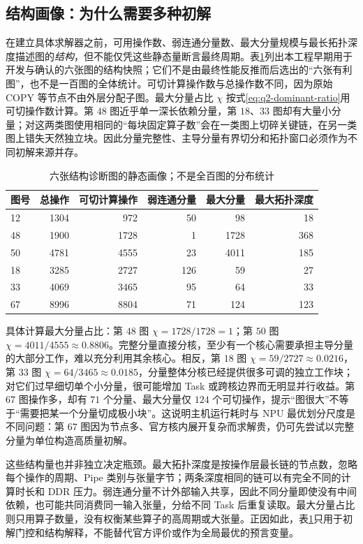 \subsection{结构画像：为什么需要多种初解}
在建立具体求解器之前，可用操作数、弱连通分量数、最大分量规模与最长拓扑深度描述图的\emph{结构}，但不能仅凭这些静态量断言最终周期。表\ref{tab:six-structure}列出本工程早期用于开发与确认的六张图的结构快照；它们不是由最终性能反推而后选出的“六张有利图”，也不是一百图的全体统计。可切计算操作数与总操作数不同，因为原始 COPY 等节点不由外层分配子图。最大分量占比 $\chi$ 按式\eqref{eq:q2-dominant-ratio}用可切操作数计算。第 $48$ 图近乎单一深长依赖分量，第 $18$、$33$ 图却有大量小分量；对这两类图使用相同的“每块固定算子数”会在一类图上切碎关键链，在另一类图上错失天然独立块。因此分量完整性、主导分量有界切分和拓扑窗口必须作为不同初解来源并存。
\begin{table}[!htbp]\centering\small
\caption{六张结构诊断图的静态画像；不是全百图的分布统计}\label{tab:six-structure}
\begin{tabular}{lrrrrr}
\toprule
图号 & 总操作 & 可切计算操作 & 弱连通分量 & 最大分量 & 最大拓扑深度\\
\midrule
12 & 1304 & 972 & 50 & 98 & 18\\
48 & 1900 & 1728 & 1 & 1728 & 368\\
50 & 4781 & 4555 & 23 & 4011 & 185\\
18 & 3285 & 2727 & 126 & 59 & 27\\
33 & 4069 & 3465 & 95 & 64 & 33\\
67 & 8996 & 8804 & 71 & 124 & 123\\
\bottomrule
\end{tabular}
\end{table}

具体计算最大分量占比：第 $48$ 图 $\chi=1728/1728=1$；第 $50$ 图 $\chi=4011/4555\approx0.8806$。完整分量直接分核，至少有一个核心需要承担主导分量的大部分工作，难以充分利用其余核心。相反，第 $18$ 图 $\chi=59/2727\approx0.0216$，第 $33$ 图 $\chi=64/3465\approx0.0185$，分量整体分核已经提供很多可调的独立工作块；对它们过早细切单个小分量，很可能增加 Task 或跨核边界而无明显并行收益。第 $67$ 图操作多，却有 $71$ 个分量、最大分量仅 $124$ 个可切操作，提示“图很大”不等于“需要把某一个分量切成极小块”。这说明主机运行耗时与 NPU 最优划分尺度是不同问题：第 $67$ 图因为节点多、官方核内展开复杂而求解贵，仍可先尝试以完整分量为单位构造高质量初解。

这些结构量也并非独立决定瓶颈。最大拓扑深度是按操作层最长链的节点数，忽略每个操作的周期、Pipe 类别与张量字节；两条深度相同的链可以有完全不同的计算时长和 DDR 压力。弱连通分量不计外部输入共享，因此不同分量即使没有中间依赖，也可能共同消费同一输入张量，分给不同 Task 后重复读取。最大分量占比则只用算子数量，没有权衡某些算子的高周期或大张量。正因如此，表\ref{tab:six-structure}只用于初解门控和结构解释，不能替代官方评价或作为全局最优的预言变量。

